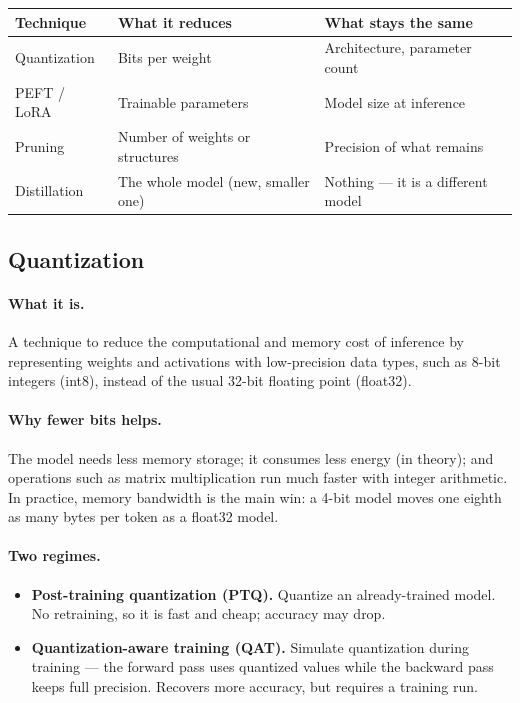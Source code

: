 \documentclass[11pt,a4paper]{article}
\begin{document}
\begin{center}
\begin{tabularx}{\textwidth}{lYY}
\textbf{Technique} & \textbf{What it reduces} & \textbf{What stays the same} \\
\hline
Quantization & Bits per weight & Architecture, parameter count \\
PEFT / LoRA & Trainable parameters & Model size at inference \\
Pruning & Number of weights or structures & Precision of what remains \\
Distillation & The whole model (new, smaller one) & Nothing --- it is a different model \\
\end{tabularx}
\end{center}

\subsection{Quantization}

\paragraph{What it is.} A technique to reduce the computational and memory cost of inference
by representing weights and activations with low-precision data types, such as 8-bit integers
(int8), instead of the usual 32-bit floating point (float32).

\paragraph{Why fewer bits helps.} The model needs less memory storage; it consumes less energy
(in theory); and operations such as matrix multiplication run much faster with integer
arithmetic. In practice, memory bandwidth is the main win: a 4-bit model moves one eighth as
many bytes per token as a float32 model.

\paragraph{Two regimes.}
\begin{itemize}
\item \textbf{Post-training quantization (PTQ).} Quantize an already-trained model. No
  retraining, so it is fast and cheap; accuracy may drop.
\item \textbf{Quantization-aware training (QAT).} Simulate quantization during training ---
  the forward pass uses quantized values while the backward pass keeps full precision.
  Recovers more accuracy, but requires a training run.
\end{itemize}
\end{document}
